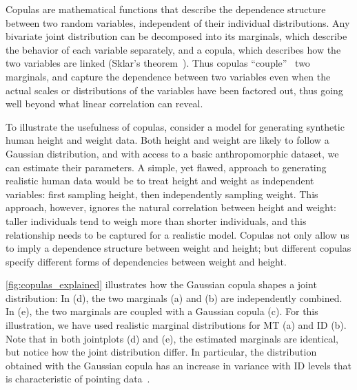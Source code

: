 \documentclass[acmlarge, manuscript,review]{acmart}
\begin{document}
Copulas are mathematical functions that describe the dependence structure between two random variables, independent of their individual distributions. Any bivariate joint distribution can be decomposed into its marginals, which describe the behavior of each variable separately, and a copula, which describes how the two variables are linked (Sklar's theorem~\cite{nelsen2006}). Thus copulas ``couple''~\cite[Chapter 1]{nelsen2006} two marginals, and capture the dependence between two variables even when the actual scales or distributions of the variables have been factored out, thus going well beyond what linear correlation can reveal.



To illustrate the usefulness of copulas, consider a model for generating synthetic human height and weight data. Both height and weight are likely to follow a Gaussian distribution, and with access to a basic anthropomorphic dataset, we can estimate their parameters. 
A simple, yet flawed, approach to generating realistic human data would be to treat height and weight as independent variables: first sampling height, then independently sampling weight. This approach, however, ignores the natural correlation between height and weight: taller individuals tend to weigh more than shorter individuals, and this relationship needs to be captured for a realistic model.
Copulas not only allow us to imply a dependence structure between weight and height; but different copulas specify different forms of dependencies between weight and height.


\autoref{fig:copulas_explained} illustrates how the Gaussian copula shapes a joint distribution: In (d), the two marginals (a) and (b) are independently combined. In (e), the two marginals are coupled with a Gaussian copula (c). For this illustration, we have used realistic marginal distributions for MT (a) and ID (b). Note that in both jointplots (d) and (e), the estimated marginals are identical, but notice how the joint distribution differ. In particular, the distribution obtained with the Gaussian copula has an increase in variance with ID levels that is characteristic of pointing data~\cite{gori2018these}.
\end{document}
